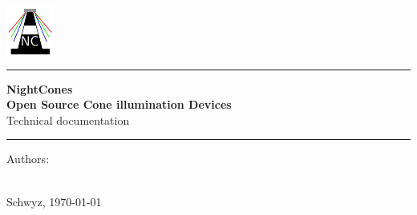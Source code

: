 \begin{titlepage}

    \vspace{4mm}

    \begin{center}
        \includegraphics[scale=6]{img/NC_Logo.pdf}
    \end{center} 


    \begin{center}
        \rule{\textwidth}{2pt}
    \end{center}

    \vspace{2mm}

    \begin{center}
      \huge{\textbf{NightCones}}\\
      \LARGE{\textbf{Open Source Cone illumination Devices}}\\
        \vspace{4mm}
        \Large{Technical documentation}
    \end{center}
    

    \begin{center}
        \rule{\textwidth}{2pt}
    \end{center}

    \vspace{4mm}

    \begin{center}
        Authors:\\
        \large{\makeatletter \@author \makeatother}\\
        \vspace{4mm}
    \end{center}

    \vspace{3mm}

    \begin{center}
        Schwyz, \today
    \end{center}

\end{titlepage}
\clearpage
